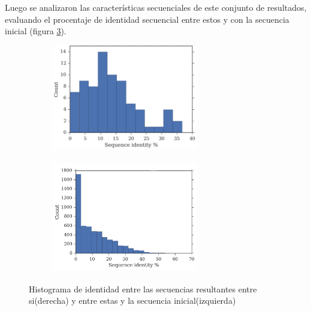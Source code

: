 Luego se analizaron las características secuenciales de este conjunto de resultados, evaluando el procentaje de identidad secuencial entre estos y con la secuencia inicial (figura \ref{fig:identity}). 




\begin{figure}[htbp]
  \begin{subfigure}[b]{200px}
    \includegraphics[width=240px]{img/resultados/againstStartSeq-74.png}
    \label{fig:identity-a}
  \end{subfigure}
  \hspace{30px}
  \begin{subfigure}[b]{200px}
    \includegraphics[width=240px,height=185px]{img/resultados/againstAll-74-borrado.png}
    \label{fig:identity-b}
  \end{subfigure}
  \caption{Histograma de identidad entre las secuencias resultantes entre si(derecha) y entre estas y la secuencia inicial(izquierda)}
  \label{fig:identity}
\end{figure}



